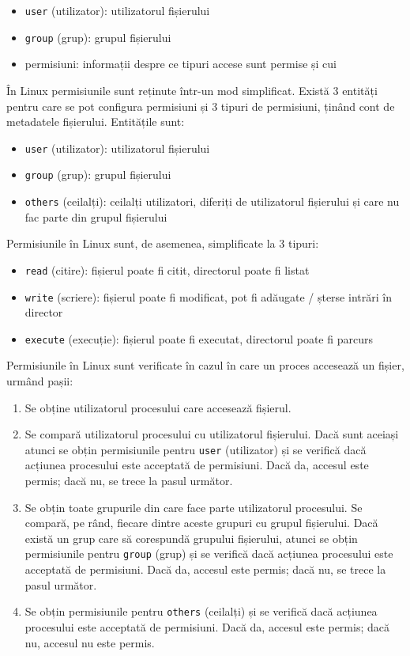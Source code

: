 \begin{itemize}
  \item \texttt{user} (utilizator): utilizatorul fișierului
  \item \texttt{group} (grup): grupul fișierului
  \item permisiuni: informații despre ce tipuri accese sunt permise și cui
\end{itemize}

În Linux permisiunile sunt reținute într-un mod simplificat.
Există 3 entități pentru care se pot configura permisiuni și 3 tipuri de permisiuni, ținând cont de metadatele fișierului.
Entitățile sunt:

\begin{itemize}
  \item \texttt{user} (utilizator): utilizatorul fișierului
  \item \texttt{group} (grup): grupul fișierului
  \item \texttt{others} (ceilalți): ceilalți utilizatori, diferiți de utilizatorul fișierului și care nu fac parte din grupul fișierului
\end{itemize}

Permisiunile în Linux sunt, de asemenea, simplificate la 3 tipuri:

\begin{itemize}
  \item \texttt{read} (citire): fișierul poate fi citit, directorul poate fi listat
  \item \texttt{write} (scriere): fișierul poate fi modificat, pot fi adăugate / șterse intrări în director
  \item \texttt{execute} (execuție): fișierul poate fi executat, directorul poate fi parcurs
\end{itemize}

Permisiunile în Linux sunt verificate în cazul în care un proces accesează un fișier, urmând pașii:

\begin{enumerate}
  \item Se obține utilizatorul procesului care accesează fișierul.
  \item Se compară utilizatorul procesului cu utilizatorul fișierului.
    Dacă sunt aceiași atunci se obțin permisiunile pentru \texttt{user} (utilizator) și se verifică dacă acțiunea procesului este acceptată de permisiuni.
    Dacă da, accesul este permis;
    dacă nu, se trece la pasul următor.
  \item Se obțin toate grupurile din care face parte utilizatorul procesului.
    Se compară, pe rând, fiecare dintre aceste grupuri cu grupul fișierului.
    Dacă există un grup care să corespundă grupului fișierului, atunci se obțin permisiunile pentru \texttt{group} (grup) și se verifică dacă acțiunea procesului este acceptată de permisiuni.
    Dacă da, accesul este permis;
    dacă nu, se trece la pasul următor.
  \item Se obțin permisiunile pentru \texttt{others} (ceilalți) și se verifică dacă acțiunea procesului este acceptată de permisiuni.
    Dacă da, accesul este permis;
    dacă nu, accesul nu este permis.
\end{enumerate}

